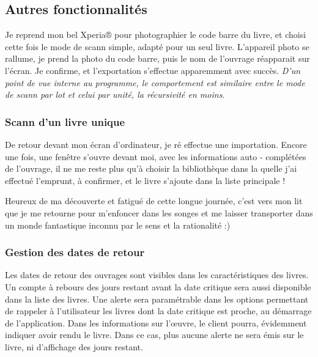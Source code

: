 \subsection {Autres fonctionnalités}

Je reprend mon bel Xperia® pour photographier le code barre du livre, et choisi cette fois le mode de scann simple, adapté pour un seul livre. 
L'appareil photo se rallume, je prend la photo du code barre, puis le nom de l'ouvrage réapparait sur l'écran.
Je confirme, et l'exportation s'effectue apparemment avec succès. 
\emph{D'un point de vue interne au programme, le comportement est similaire entre le mode de scann par lot et celui par unité, la récursivité en moins.}

\subsubsection {Scann d'un livre unique}
De retour devant mon écran d'ordinateur, je ré effectue une importation. 
Encore une fois, une fenêtre s'ouvre devant moi, avec les informations auto - complétées de l'ouvrage, il ne me reste plus qu'à choisir la bibliothèque dans la quelle j'ai effectué l'emprunt, à confirmer, et le livre s'ajoute dans la liste principale !

Heureux de ma découverte et fatigué de cette longue journée, c'est vers mon lit que je me retourne pour m'enfoncer dans les songes et me laisser transporter dans un monde fantastique inconnu par le sens et la rationalité :) 

\subsubsection {Gestion des dates de retour}
Les dates de retour des ouvrages sont visibles dans les caractéristiques des livres. 
Un compte à rebours des jours restant avant la date critique sera aussi disponible dans la liste des livres.
Une alerte sera paramétrable dans les options permettant de rappeler à l'utilisateur les livres dont la date critique est proche, au démarrage de l'application.
Dans les informations sur l'œuvre, le client pourra, évidemment indiquer avoir rendu le livre.
Dans ce cas, plus aucune alerte ne sera émis sur le livre, ni d'affichage des jours restant.

